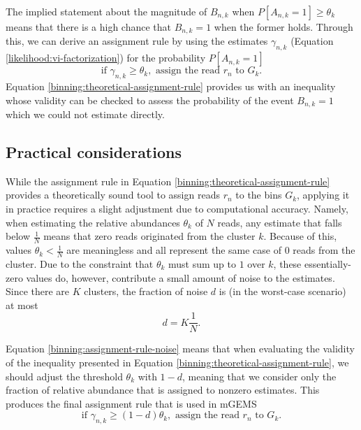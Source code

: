 \documentclass[officiallayout]{tktla}
\begin{document}
The implied statement about the magnitude of $B_{n, k}$ when
$P\left[A_{n, k} = 1\right] \geq \theta_{k}$ means that there is a
high chance that $B_{n, k} = 1$ when the former holds. Through this,
we can derive an assignment rule by using the estimates $\gamma_{n,
  k}$ (Equation \ref{likelihood:vi-factorization}) for the probability
$P\left[A_{n, k} = 1\right]$
\begin{equation}
  \label{binning:theoretical-assignment-rule}
  \text{if } \gamma_{n, k} \geq \theta_{k}, \text{ assign the read } r_{n} \text{ to } G_{k}.
\end{equation}
Equation \ref{binning:theoretical-assignment-rule} provides us with an
inequality whose validity can be checked to assess the probability of
the event $B_{n, k} = 1$ which we could not estimate directly.

\subsection{Practical considerations}

While the assignment rule in Equation
\ref{binning:theoretical-assignment-rule} provides a theoretically
sound tool to assign reads $r_{n}$ to the bins $G_{k}$, applying it in
practice requires a slight adjustment due to computational
accuracy. Namely, when estimating the relative abundances $\theta_{k}$
of $N$ reads, any estimate that falls below $\frac{1}{N}$ means that
zero reads originated from the cluster $k$. Because of this, values
$\theta_{k} < \frac{1}{N}$ are meaningless and all represent the same
case of 0 reads from the cluster. Due to the constraint that
$\theta_{k}$ must sum up to $1$ over $k$, these essentially-zero
values do, however, contribute a small amount of noise to the
estimates. Since there are $K$ clusters, the fraction of noise $d$ is
(in the worst-case scenario) at most
\begin{equation}
  \label{binning:assignment-rule-noise}
  d = K\frac{1}{N}.
\end{equation}

Equation \ref{binning:assignment-rule-noise} means that when
evaluating the validity of the inequality presented in Equation
\ref{binning:theoretical-assignment-rule}, we should adjust the
threshold $\theta_k$ with $1 - d$, meaning that we consider only the
fraction of relative abundance that is assigned to nonzero
estimates. This produces the final assignment rule that is used in
mGEMS
\begin{equation}
  \label{binning:assignment-rule}
  \text{if } \gamma_{n, k} \geq (1 - d)\theta_{k}, \text{ assign the read } r_{n} \text{ to } G_{k}.
\end{equation}
\end{document}
